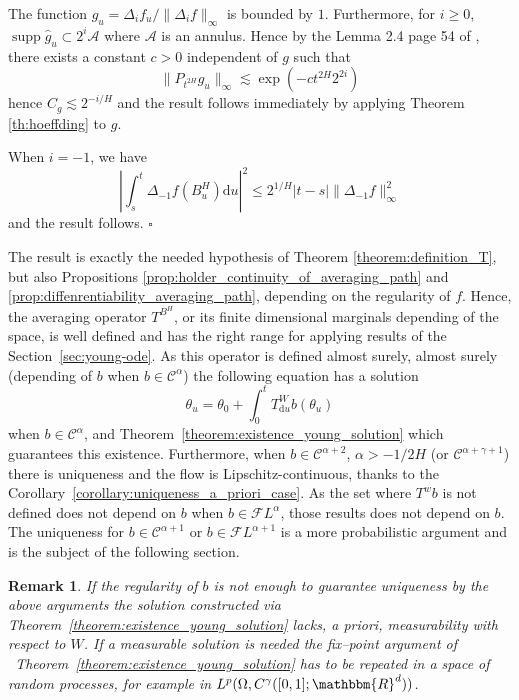 \documentclass[a4paper,11pt]{article}
\newcommand{\mathd}{\mathrm{d}}
\newcommand{\tmop}[1]{\ensuremath{\operatorname{#1}}}
\newtheorem{remark}[theorem]{Remark}
\newenvironment{proof}{{\sc Proof.}}{\hfill$\square$}
\newcommand{\CC}{\mathscr C}
\newcommand{\CF}{\mathscr F}
\begin{document}
\begin{proof}
  The function $g_{u} = \Delta_{i} f_{u} / \| \Delta_{i} f \|_{\infty}$ is
  bounded by $1$. Furthermore, for $i \geqslant 0$, $\tmop{supp}   \hat{g}_{u}
  \subset 2^{i} \mathcal{A}$ where $\mathcal{A}$ is an annulus. Hence by the
  Lemma 2.4 page 54 of {\cite{bahouri_fourier_2011}}, there exists a constant
  $c>0$ independent of $g$ such that
  \[ \| P_{t^{2H}} g_{u} \|_{\infty} \lesssim \exp ( -c t^{2H} 2^{2i} ) \]
  hence $C_{g} \lesssim 2^{-i/H}$ and the result follows immediately by
  applying Theorem \ref{th:hoeffding} to $g$.
  
  When $i=-1$, we have
  \[ \left\lvert \int_{s}^{t} \Delta_{-1} f ( B^{H}_{u} ) \mathd u \right\lvert^{2}
     \leqslant 2^{1/H} | t-s | \| \Delta_{-1} f \|_{\infty}  ^{2} \]
  and the result follows.
\end{proof}

The result is exactly the needed hypothesis of Theorem
\ref{theorem:definition_T}, but also Propositions
\ref{prop:holder_continuity_of_averaging_path} and
\ref{prop:diffenrentiability_averaging_path}, depending on the regularity of
$f$. Hence, the averaging operator $T^{B^{H}}$, or its finite dimensional
marginals depending of the space, is well defined and has the right range for
applying results of the Section~\ref{sec:young-ode}. As this operator is
defined almost surely, almost surely (depending of $b$ when $b \in
\CC^{\alpha}$) the following equation has a solution
\[ \theta_{u} = \theta_{0} + \int_{0}^{t} T^{W}_{\mathd u} b ( \theta_{u} ) \]
when $b \in \CC^{\alpha}$, and Theorem~\ref{theorem:existence_young_solution}
which guarantees this existence. Furthermore, when $b \in \CC^{\alpha +2}$,
$\alpha >-1/2H$ (or $\CC^{\alpha + \gamma +1}$) there is uniqueness and the
flow is Lipschitz-continuous, thanks to the
Corollary~\ref{corollary:uniqueness_a_priori_case}. As the set where $T^{w} b$
is not defined does not depend on $b$ when $b \in \CF L^{\alpha}$, those
results does not depend on $b$. The uniqueness for $b \in \CC^{\alpha +1}$ or
$b \in \CF L^{\alpha +1}$ is a more probabilistic argument and is the subject
of the following section.

\begin{remark}
  If the regularity of $b$ is not enough to guarantee uniqueness by the above
  arguments the solution constructed via
  Theorem~\ref{theorem:existence_young_solution} lacks, a priori,
  measurability with respect to $W$. If a measurable solution is needed the
  fix--point argument of \ Theorem~\ref{theorem:existence_young_solution} has
  to be repeated in a space of random processes, for example in $L^{p} (
  \Omega ,C^{\gamma} ( [ 0,1 ] ;\mathbbm{R}^{d} ) )$.
\end{remark}
\end{document}
